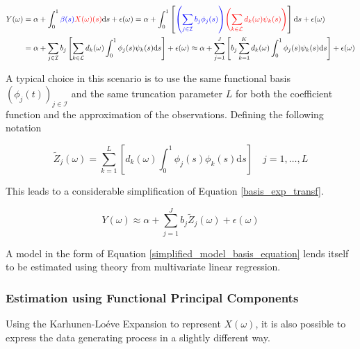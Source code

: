 \documentclass[11pt,twoside,a4paper]{article}
\begin{document}
	\begin{equation}\label{basis_exp_transf}
		\begin{split}
			Y(\omega) & = \alpha + \int_{0}^{1} {\color{blue}\beta(s)} {\color{red}X(\omega)(s)}\mathrm{d}s + \epsilon(\omega)
			 = \alpha + \int_{0}^{1}\left[{\color{blue}\left(\sum_{j \in \mathcal{I}} b_j  \phi_j(s)\right)} {\color{red}\left(\sum_{k \in \mathcal{L}} d_k(\omega)  \psi_k(s)\right)} \right]\mathrm{d}s + \epsilon(\omega) \\
			& = \alpha + \sum_{j \in \mathcal{I}} b_j \left[\sum_{k \in \mathcal{L}} d_k(\omega) \int_{0}^{1} \phi_j(s) \psi_k(s) \mathrm{d}s\right] + \epsilon(\omega) 
			\approx \alpha + \sum_{j = 1}^{J} \left[b_j \sum_{k = 1}^{K}  d_k(\omega) \int_{0}^{1} \phi_j(s) \psi_k(s) \mathrm{d}s\right] + \epsilon(\omega)
		\end{split}
	\end{equation}

	A typical choice in this scenario is to use the same functional basis $\left(\phi_j(t)\right)_{j \in \mathcal{I}}$ and the same truncation parameter $L$ for both the coefficient function and the approximation of the observations. Defining the following notation 

	\begin{equation}
			\tilde{Z}_j(\omega) = \sum_{k = 1}^{L} \left[d_k(\omega) \int_{0}^{1} \phi_j(s) \phi_k(s) \mathrm{d}s \right] \quad j = 1, \dots, L
	\end{equation}

	This leads to a considerable simplification of Equation \ref{basis_exp_transf}.
	
	\begin{equation}\label{simplified_model_basis_equation}
		Y(\omega) \approx \alpha + \sum_{j = 1}^{J} b_j \tilde{Z}_j(\omega) + \epsilon(\omega)
	\end{equation}

	A model in the form of Equation \ref{simplified_model_basis_equation} lends itself to be estimated using theory from multivariate linear regression.
	
	\subsubsection{Estimation using Functional Principal Components}
	
	Using the Karhunen-Lo\'{e}ve Expansion to represent $X(\omega)$, it is also possible to express the data generating process in a slightly different way.
	
\end{document}
